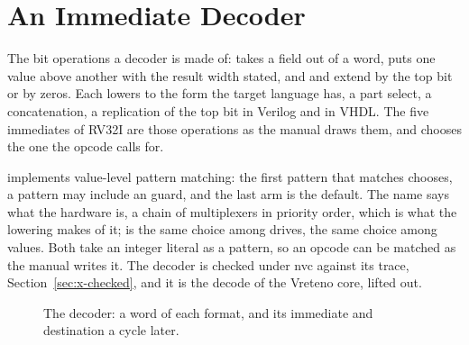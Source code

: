 \section{An Immediate Decoder}
\label{sec:x-imm}

The bit operations a decoder is made of: 
takes a field out of a word,  puts one value
above another with the result width stated, and  and
 extend by the top bit or by zeros. Each lowers to the
form the target language has, a part select, a concatenation, a
replication of the top bit in Verilog and  in VHDL. The
five immediates of RV32I are those operations as the manual draws
them, and  chooses the one the opcode calls for.

 implements value-level pattern matching: the first pattern that
matches chooses, a pattern may include an  guard, and the last
arm is the default. The name says what the hardware is, a chain of
multiplexers in priority order, which is what the lowering makes of
it;  is the same choice among drives,  the
same choice among values. Both take an integer literal as a pattern,
so an opcode can be matched as the manual writes it. The decoder is
checked under nvc against its trace, Section~\ref{sec:x-checked}, and
it is the decode of the Vreteno core, lifted out.

\begin{figure}[htbp]
\centering

\caption{The decoder: a word of each format, and its immediate and
destination a cycle later.}
\label{fig:x-imm}
\end{figure}




